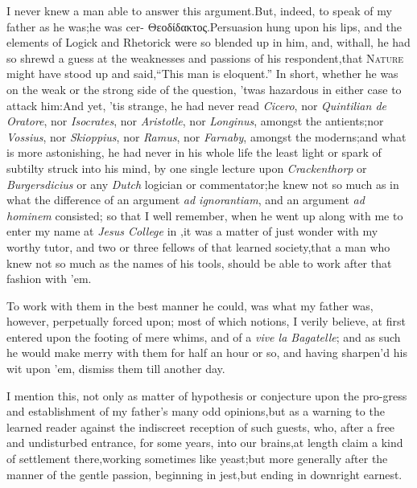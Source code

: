 \documentclass{article}
\begin{document}
I never knew a man able to answer this argument.\tsk  But, indeed, to speak of
my father as he was;\tsk  he was cer-
{\small Θεοδίδακτο}ς.\tsk  Persuasion hung upon his lips, and the
elements of Logick and Rhetorick were so blended up in him,\tsk\break
and, withall,
he had so shrewd a guess at the weaknesses and passions of his
respondent,\tsh  that \textsc{Nature} might have stood up and
said,\tsk  “This man is eloquent.”  In short, whether he was
on the weak or the strong side of the question, ’twas hazardous in either
case to attack him:\tsk  And yet, ’tis strange, he had never read
\textit{Cicero}, nor \textit{Quintilian de Oratore}, nor \textit{Isocrates}, nor
\textit{Aristotle}, nor \textit{Longinus}, amongst the antients;\tsk  nor
\textit{Vossius}, nor \textit{Skioppius}, nor \textit{Ramus}, nor \textit{Farnaby},
amongst the moderns;\tsk  and what is more astonishing, he had never in his
whole life the least light or spark of subtilty struck into his mind, by one
single lecture upon \textit{Crackenthorp} or \textit{Burgersdicius} or any
\textit{Dutch} logician or commentator;\tsk  he knew not so much as in what the
difference of an argument \textit{ad ignorantiam}, and an argument \textit{ad
hominem} consisted; so that I well remember, when he went up along with me
to enter my name at \textit{Jesus College} in \astiv,\tsk  it was a matter of just
wonder with my worthy tutor, and two or three fellows of that learned
society,\tsk  that a man who knew not so much as the names of his tools,
should be able to work after that fashion with ’em.

To work with them in the best manner he could, was what my
father was, however, perpetually forced upon;\tsh\break 
{}
most of which notions, I verily believe, at
first entered upon the footing of mere whims, and of a \textit{vive la
Bagatelle}; and as such he would make merry with them for half
an hour or so, and having sharpen’d his wit upon ’em, dismiss them
till another day.

I mention this, not only as matter of hypothesis or conjecture
upon the pro-\break gress and establishment of my father’s many
odd opinions,\tsk  but as a warning to the learned reader against
the indiscreet reception of such guests, who, after a free and
undisturbed entrance, for some years, into our brains,\tsk  at
length claim a kind of settlement there,\tsh  working
sometimes like yeast;\tsk  but more generally after the manner of
the gentle passion, beginning in jest,\tsk  but ending in
downright earnest.\\
\end{document}
